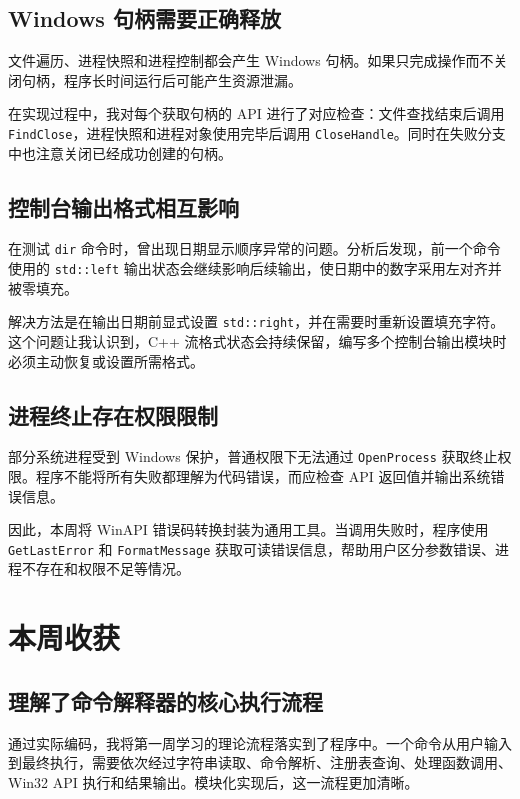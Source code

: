 \documentclass[UTF8]{ctexart}
\begin{document}
\subsection{Windows 句柄需要正确释放}

文件遍历、进程快照和进程控制都会产生 Windows 句柄。如果只完成操作而不关闭句柄，程序长时间运行后可能产生资源泄漏。

在实现过程中，我对每个获取句柄的 API 进行了对应检查：文件查找结束后调用 \texttt{FindClose}，进程快照和进程对象使用完毕后调用 \texttt{CloseHandle}。同时在失败分支中也注意关闭已经成功创建的句柄。

\subsection{控制台输出格式相互影响}

在测试 \texttt{dir} 命令时，曾出现日期显示顺序异常的问题。分析后发现，前一个命令使用的 \texttt{std::left} 输出状态会继续影响后续输出，使日期中的数字采用左对齐并被零填充。

解决方法是在输出日期前显式设置 \texttt{std::right}，并在需要时重新设置填充字符。这个问题让我认识到，C++ 流格式状态会持续保留，编写多个控制台输出模块时必须主动恢复或设置所需格式。

\subsection{进程终止存在权限限制}

部分系统进程受到 Windows 保护，普通权限下无法通过 \texttt{OpenProcess} 获取终止权限。程序不能将所有失败都理解为代码错误，而应检查 API 返回值并输出系统错误信息。

因此，本周将 WinAPI 错误码转换封装为通用工具。当调用失败时，程序使用 \texttt{GetLastError} 和 \texttt{FormatMessage} 获取可读错误信息，帮助用户区分参数错误、进程不存在和权限不足等情况。

\section{本周收获}

\subsection{理解了命令解释器的核心执行流程}

通过实际编码，我将第一周学习的理论流程落实到了程序中。一个命令从用户输入到最终执行，需要依次经过字符串读取、命令解析、注册表查询、处理函数调用、Win32 API 执行和结果输出。模块化实现后，这一流程更加清晰。
\end{document}
